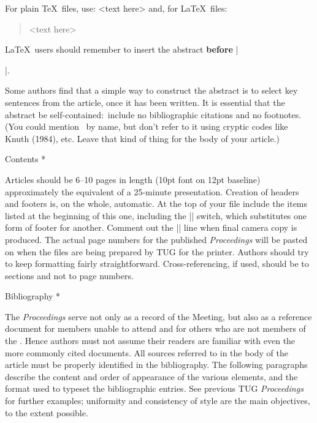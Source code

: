 For plain \TeX\ files, use:
\verbatim
\abstract
<text here>
\endabstract
\endverbatim
%
and, for \LaTeX\ files:
\verbatim
\begin{abstract}
<text here>
\end{abstract}
\maketitle
\endverbatim
\LaTeX\ users should remember to insert the abstract {\bf before}
|\maketitle|.
 
Some authors find that a simple way to construct the abstract is to
select key sentences from the article, once it has been written.  It is
essential that the abstract be self-contained:\ include no bibliographic
citations and no footnotes.  (You could mention \TB\ by name, but don't
refer to it using cryptic codes like Knuth (1984), etc.  Leave that kind
of thing for the body of your article.)
 
\subhead * Contents *
 
Articles should be 6--10 pages in length (10pt font on 12pt baseline)\Dash
approximately the equivalent of a 25-minute presentation.  Creation
of headers and footers is, on the whole, automatic.  At the top of your
file include the items listed at the beginning of this one, including
the |\preprint| switch, which substitutes one form of footer for
another.  Comment out the |\preprint| line when final camera copy is
produced.  The actual page numbers for the published {\sl Proceedings\/}
will be pasted on when the files are being prepared by
TUG for the printer.  Authors should try to keep formatting fairly
straightforward.  Cross-referencing, if used, should be to sections and
not to page numbers.
 
\subhead * Bibliography *
 
The {\sl Proceedings\/} serve not only as a record of the Meeting, but
also as a reference document for members unable to attend and for others
who are not members of the \TUG.  Hence authors must not assume their
readers are familiar with even the more commonly cited documents.  All
sources referred to in the body of the article must be properly
identified in the bibliography.  The following paragraphs describe the
content and order of appearance of the various elements, and the format
used to typeset the bibliographic entries.  See previous TUG {\sl
Proceedings\/} for further examples; uniformity and consistency of style
are the main objectives, to the extent possible.
 
